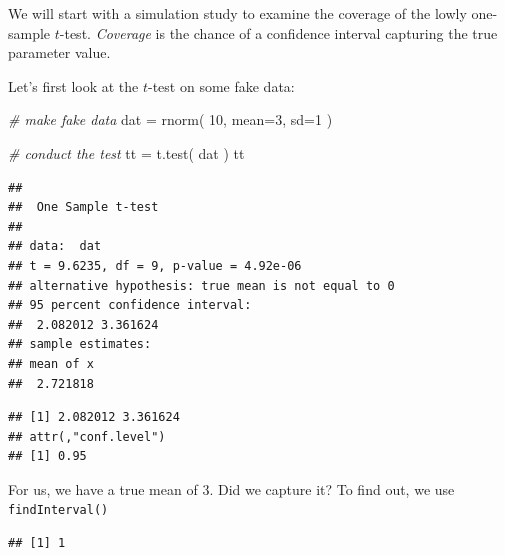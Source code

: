 \documentclass[
]{book}
\newenvironment{Shaded}{\begin{snugshade}}{\end{snugshade}}
\newcommand{\AttributeTok}[1]{\textcolor[rgb]{0.77,0.63,0.00}{#1}}
\newcommand{\CommentTok}[1]{\textcolor[rgb]{0.56,0.35,0.01}{\textit{#1}}}
\newcommand{\DecValTok}[1]{\textcolor[rgb]{0.00,0.00,0.81}{#1}}
\newcommand{\FunctionTok}[1]{\textcolor[rgb]{0.00,0.00,0.00}{#1}}
\newcommand{\NormalTok}[1]{#1}
\newcommand{\OtherTok}[1]{\textcolor[rgb]{0.56,0.35,0.01}{#1}}
\newcommand{\SpecialCharTok}[1]{\textcolor[rgb]{0.00,0.00,0.00}{#1}}
\begin{document}
We will start with a simulation study to examine the coverage of the lowly
one-sample \(t\)-test. \emph{Coverage} is the chance of a confidence interval
capturing the true parameter value.

Let's first look at the \(t\)-test on some fake data:

\begin{Shaded}
\begin{Highlighting}[]
\CommentTok{\# make fake data}
\NormalTok{dat }\OtherTok{=} \FunctionTok{rnorm}\NormalTok{( }\DecValTok{10}\NormalTok{, }\AttributeTok{mean=}\DecValTok{3}\NormalTok{, }\AttributeTok{sd=}\DecValTok{1}\NormalTok{ )}

\CommentTok{\# conduct the test}
\NormalTok{tt }\OtherTok{=} \FunctionTok{t.test}\NormalTok{( dat )}
\NormalTok{tt}
\end{Highlighting}
\end{Shaded}

\begin{verbatim}
## 
##  One Sample t-test
## 
## data:  dat
## t = 9.6235, df = 9, p-value = 4.92e-06
## alternative hypothesis: true mean is not equal to 0
## 95 percent confidence interval:
##  2.082012 3.361624
## sample estimates:
## mean of x 
##  2.721818
\end{verbatim}

\begin{Shaded}
\end{Shaded}

\begin{verbatim}
## [1] 2.082012 3.361624
## attr(,"conf.level")
## [1] 0.95
\end{verbatim}

For us, we have a true mean of 3. Did we capture it? To find out, we use \texttt{findInterval()}

\begin{Shaded}
\end{Shaded}

\begin{verbatim}
## [1] 1
\end{verbatim}
\end{document}
